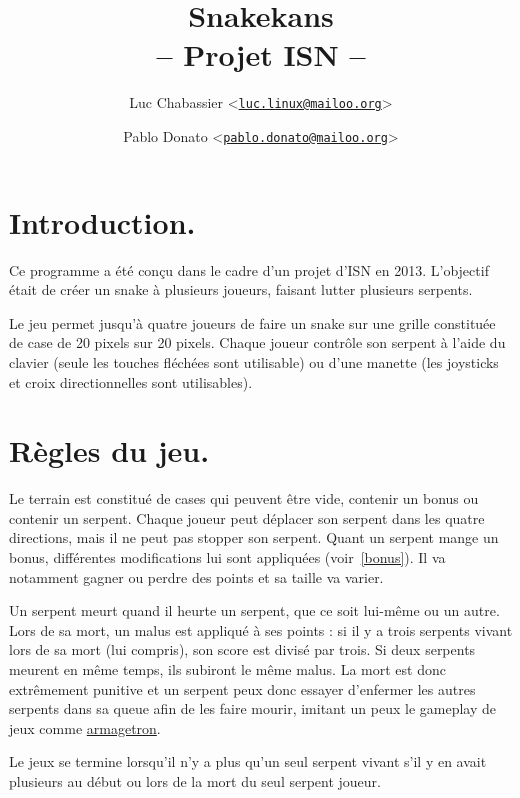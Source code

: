 \documentclass{article}
\title{Snakekans\\-- Projet ISN --}
\author{Luc Chabassier <\href{mailto:luc.linux@mailoo.org}{\nolinkurl{luc.linux@mailoo.org}}> \and Pablo Donato <\href{mailto:pablo.donato@mailoo.org}{\nolinkurl{pablo.donato@mailoo.org}}>}
\begin{document}
\maketitle

\tableofcontents

\section{Introduction.}
Ce programme a été conçu dans le cadre d'un projet d'ISN en 2013. L'objectif était de créer un snake à plusieurs joueurs, faisant lutter plusieurs serpents.

Le jeu permet jusqu'à quatre joueurs de faire un snake sur une grille constituée de case de 20 pixels sur 20 pixels. Chaque joueur contrôle son serpent à l'aide du clavier (seule les touches fléchées sont utilisable) ou d'une manette (les joysticks et croix directionnelles sont utilisables).

\section{Règles du jeu.}
Le terrain est constitué de cases qui peuvent être vide, contenir un bonus ou contenir un serpent. Chaque joueur peut déplacer son serpent dans les quatre directions, mais il ne peut pas stopper son serpent. Quant un serpent mange un bonus, différentes modifications lui sont appliquées (voir~\ref{bonus}). Il va notamment gagner ou perdre des points et sa taille va varier.

Un serpent meurt quand il heurte un serpent, que ce soit lui-même ou un autre. Lors de sa mort, un malus est appliqué à ses points : si il y a trois serpents vivant lors de sa mort (lui compris), son score est divisé par trois. Si deux serpents meurent en même temps, ils subiront le même malus. La mort est donc extrêmement punitive et un serpent peux donc essayer d'enfermer les autres serpents dans sa queue afin de les faire mourir, imitant un peux le gameplay de jeux comme \href{http://armagetronad.org/}{armagetron}.

Le jeux se termine lorsqu'il n'y a plus qu'un seul serpent vivant s'il y en avait plusieurs au début ou lors de la mort du seul serpent joueur.
\end{document}
